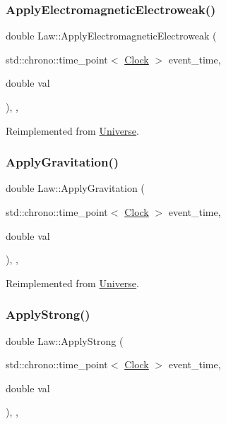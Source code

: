 \subsubsection{\texorpdfstring{Apply\+Electromagnetic\+Electroweak()}{ApplyElectromagneticElectroweak()}}
{\footnotesize\ttfamily double Law\+::\+Apply\+Electromagnetic\+Electroweak (\begin{DoxyParamCaption}\item[{std\+::chrono\+::time\+\_\+point$<$ \mbox{\hyperlink{universe_8h_a0ef8d951d1ca5ab3cfaf7ab4c7a6fd80}{Clock}} $>$}]{event\+\_\+time,  }\item[{double}]{val }\end{DoxyParamCaption})\hspace{0.3cm}{\ttfamily [inline]}, {\ttfamily [final]}, {\ttfamily [virtual]}}



Reimplemented from \mbox{\hyperlink{classUniverse_a4c36c1ab30db993307f88363dde5e8c5}{Universe}}.

\mbox{\label{classLaw_a04efdc724335219ab0affdcffb55eea2}} 
\subsubsection{\texorpdfstring{Apply\+Gravitation()}{ApplyGravitation()}}
{\footnotesize\ttfamily double Law\+::\+Apply\+Gravitation (\begin{DoxyParamCaption}\item[{std\+::chrono\+::time\+\_\+point$<$ \mbox{\hyperlink{universe_8h_a0ef8d951d1ca5ab3cfaf7ab4c7a6fd80}{Clock}} $>$}]{event\+\_\+time,  }\item[{double}]{val }\end{DoxyParamCaption})\hspace{0.3cm}{\ttfamily [inline]}, {\ttfamily [final]}, {\ttfamily [virtual]}}



Reimplemented from \mbox{\hyperlink{classUniverse_a76c0b5e63c2a7d1988c44db341c3d64c}{Universe}}.

\mbox{\label{classLaw_ab38659b209055df7e59f4bcd1b9e545a}} 
\subsubsection{\texorpdfstring{Apply\+Strong()}{ApplyStrong()}}
{\footnotesize\ttfamily double Law\+::\+Apply\+Strong (\begin{DoxyParamCaption}\item[{std\+::chrono\+::time\+\_\+point$<$ \mbox{\hyperlink{universe_8h_a0ef8d951d1ca5ab3cfaf7ab4c7a6fd80}{Clock}} $>$}]{event\+\_\+time,  }\item[{double}]{val }\end{DoxyParamCaption})\hspace{0.3cm}{\ttfamily [inline]}, {\ttfamily [final]}, {\ttfamily [virtual]}}



